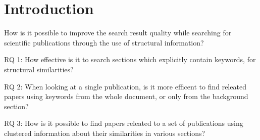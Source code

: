 \chapter{Introduction}
\label{cha:introduction}


How is it possible to improve the search result quality while searching for scientific publications through the use of structural information?

RQ 1: How effective is it to search sections which explicitly contain keywords, for structural similarities?

RQ 2: When looking at a single publication, is it more efficent to find releated papers using keywords from the whole document, or only from the background section?

RQ 3: How is it possible to find papers releated to a set of publications using clustered information about their similarities in various sections?